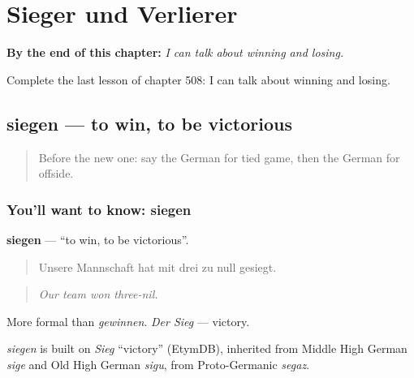 
\chapter{Sieger und Verlierer}
\label{ch:ge-sieger-und-verlierer}

\begin{chapteropening}
\textbf{By the end of this chapter:} \emph{I can talk about winning and losing.}

Complete the last lesson of chapter 508: I can talk about winning and losing.
\end{chapteropening}

\section[siegen]{siegen — to win, to be victorious}

\label{lesson:GE-C508-siegen}



\begin{quote}
Before the new one: say the German for tied game, then the German for offside.
\end{quote}

\subsection*{You'll want to know: siegen}
\textbf{siegen} — \textquotedblleft{}to win, to be victorious\textquotedblright{}.

\begin{quote}
Unsere Mannschaft hat mit drei zu null gesiegt.
\end{quote}

\begin{quote}
\emph{Our team won three-nil.}
\end{quote}

More formal than \emph{gewinnen}. \emph{Der Sieg} — victory.

\begin{cousinweb}
\emph{siegen} is built on \emph{Sieg} \textquotedblleft{}victory\textquotedblright{} (EtymDB), inherited from Middle High German \emph{sige} and Old High German \emph{sigu}, from Proto-Germanic \emph{segaz}.
\end{cousinweb}

